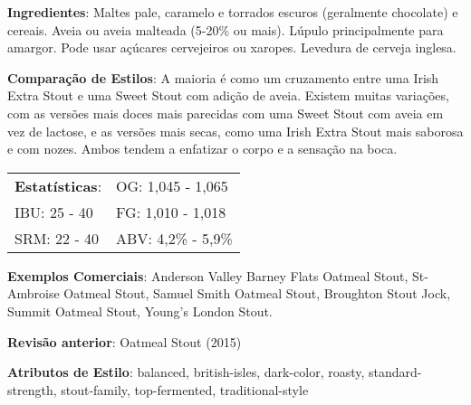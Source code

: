 \textbf{Ingredientes}: Maltes pale, caramelo e torrados escuros (geralmente chocolate) e cereais. Aveia ou aveia malteada (5-20\% ou mais). Lúpulo principalmente para amargor. Pode usar açúcares cervejeiros ou xaropes. Levedura de cerveja inglesa.

\textbf{Comparação de Estilos}: A maioria é como um cruzamento entre uma Irish Extra Stout e uma Sweet Stout com adição de aveia. Existem muitas variações, com as versões mais doces mais parecidas com uma Sweet Stout com aveia em vez de lactose, e as versões mais secas, como uma Irish Extra Stout mais saborosa e com nozes. Ambos tendem a enfatizar o corpo e a sensação na boca.

\begin{tabular}{@{}p{35mm}p{35mm}@{}}
  \textbf{Estatísticas}: & OG: 1,045 - 1,065 \\
  IBU: 25 - 40  & FG: 1,010 - 1,018 \\
  SRM: 22 - 40  & ABV: 4,2\% - 5,9\%
\end{tabular}

\textbf{Exemplos Comerciais}: Anderson Valley Barney Flats Oatmeal Stout, St-Ambroise Oatmeal Stout, Samuel Smith Oatmeal Stout, Broughton Stout Jock, Summit Oatmeal Stout, Young's London Stout.

\textbf{Revisão anterior}: Oatmeal Stout (2015)

\textbf{Atributos de Estilo}: balanced, british-isles, dark-color, roasty, standard-strength, stout-family, top-fermented, traditional-style
